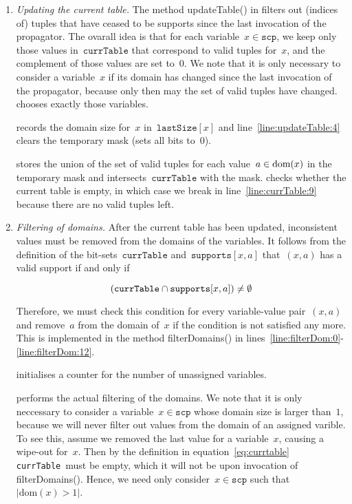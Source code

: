 \documentclass[a4paper,11pt]{article}
\newcommand{\Dom}[1]{\text{dom}({#1})}
\newcommand{\Scp}{\texttt{scp}}
\newcommand{\CurrTable}{\texttt{currTable}}
\newcommand{\LastSizes}{\texttt{lastSize}}
\newcommand{\Supports}{\texttt{supports}}
\begin{document}
\begin{enumerate}
\item \textit{Updating the current table.} 
  The method updateTable() in 
   filters out (indices of)
  tuples that have ceased to be supports since the last invocation of the
  propagator. The ovarall idea is that for each variable~$x \in \Scp$, we keep 
  only those values in~$\CurrTable$ that correspond to valid tuples for~$x$, and the
  complement of those values are set to~$0$. We note that
  it is only necessary to consider a variable~$x$ if its domain has changed
  since the last invocation of the propagator, because only then
  may the set of valid tuples have changed.~
  chooses exactly those variables.

   records the domain size for~$x$ in~$\LastSizes[x]$
  and line~\ref{line:updateTable:4} clears the temporary mask (sets all bits to~$0$).

   stores the union of the
  set of valid tuples for each value~$a \in \text{dom}(x)$ in the temporary mask
  and  intersects~$\CurrTable$ with the mask.
   checks whether the current table is empty,
  in which case we break in line~\ref{line:currTable:9}
  because there are no valid tuples left.

\item 
  \textit{Filtering of domains.}
  After the current table has been updated, inconsistent values must be removed
  from the domains of the variables.   
  It follows from the definition of the bit-sets~$\CurrTable$ and~$\Supports[x,a]$
  that~$(x,a)$ has a valid support if and only if 

  \begin{equation}
    \label{eq:validcond}
    (\CurrTable \Inter \Supports[x,a]) \neq \emptyset
  \end{equation}

  Therefore, we must check this condition for every variable-value pair~$(x,a)$ and
  remove~$a$ from the domain of~$x$ if the condition is not satisfied any more.
  This is implemented in the method filterDomains()
  in lines~\ref{line:filterDom:0}-\ref{line:filterDom:12}.

   initialises a counter for the number of unassigned
  variables.

   performs the
  actual filtering of the domains. We note that it is only neccessary to
  consider a variable~$x \in \Scp$ whose domain size is larger than~$1$,
  because we will never filter out values from the domain of an assigned
  varible. To see this, assume we removed the last value for a variable~$x$,
  causing a wipe-out for~$x$. Then by the definition in equation~\ref{eq:currtable}
  \CurrTable~must be empty,
  which it will not be upon invocation of filterDomains(). Hence, we need
  only consider~$x \in \Scp$ such that~$|\Dom{x} > 1|$.


\end{enumerate}
\end{document}
